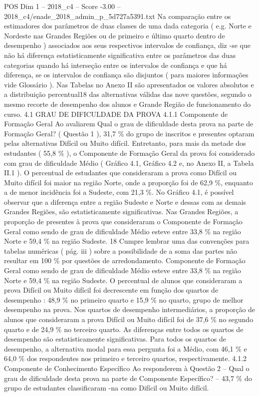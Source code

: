 \begin{textsample}{POS Dim 1 – 2018\_c4 – Score -3.00 – 2018\_c4/enade\_2018\_admin\_p\_5d727a5391.txt}
Na comparação entre os estimadores dos parâmetros de duas classes de uma dada categoria ( e.g.
Norte e Nordeste nas Grandes Regiões ou de primeiro e último quarto dentro de desempenho ) associados aos seus respectivos intervalos de confiança, diz -se que não há diferença estatisticamente significativa entre os parâmetros das duas categorias quando há interseção entre os intervalos de confiança e que há diferença, se os intervalos de confiança são disjuntos ( para maiores informações vide Glossário ).
Nas Tabelas no Anexo II são apresentados os valores absolutos e a distribuição percentual18 das alternativas válidas das nove questões, segundo o mesmo recorte de desempenho dos alunos e Grande Região de funcionamento do curso. 4.1 GRAU DE DIFICULDADE DA PROVA 4.1.1 Componente de Formação Geral Ao avaliarem Qual o grau de dificuldade desta prova na parte de Formação Geral? ( Questão 1 ), 31,7 \% do grupo de inscritos e presentes optaram pelas alternativas Difícil ou Muito difícil.
Entretanto, para mais da metade dos estudantes ( 55,8 \% ), o Componente de Formação Geral da prova foi considerado com grau de dificuldade Médio ( Gráfico 4.1, Gráfico 4.2 e, no Anexo II, a Tabela II.1 ).
O percentual de estudantes que consideraram a prova como Difícil ou Muito difícil foi maior na região Norte, onde a proporção foi de 62,9 \%, enquanto a de menor incidência foi a Sudeste, com 21,3 \%.
No Gráfico 4.1, é possível observar que a diferença entre a região Sudeste e Norte e dessas com as demais Grandes Regiões, são estatisticamente significativas.
Nas Grandes Regiões, a proporção de presentes à prova que consideraram o Componente de Formação Geral como sendo de grau de dificuldade Médio esteve entre 33,8 \% na região Norte e 59,4 \% na região Sudeste. 18 Cumpre lembrar uma das convenções para tabelas numéricas ( pág. iii ) sobre a possibilidade de a soma das partes não resultar em 100 \% por questões de arredondamento.
Componente de Formação Geral como sendo de grau de dificuldade Médio esteve entre 33,8 \% na região Norte e 59,4 \% na região Sudeste.
O percentual de alunos que consideraram a prova Difícil ou Muito difícil foi decrescente em função dos quartos de desempenho : 48,9 \% no primeiro quarto e 15,9 \% no quarto, grupo de melhor desempenho na prova.
Nos quartos de desempenho intermediários, a proporção de alunos que consideraram a prova Difícil ou Muito difícil foi de 37,6 \% no segundo quarto e de 24,9 \% no terceiro quarto.
As diferenças entre todos os quartos de desempenho são estatisticamente significativas.
Para todos os quartos de desempenho, a alternativa modal para essa pergunta foi a Médio, com 46,1 \% e 64,0 \% dos respondentes nos primeiro e terceiro quartos, respectivamente. 4.1.2 Componente de Conhecimento Específico Ao responderem à Questão 2 – Qual o grau de dificuldade desta prova na parte de Componente Específico? – 43,7 \% do grupo de estudantes classificaram -na como Difícil ou Muito difícil.

\end{textsample}
